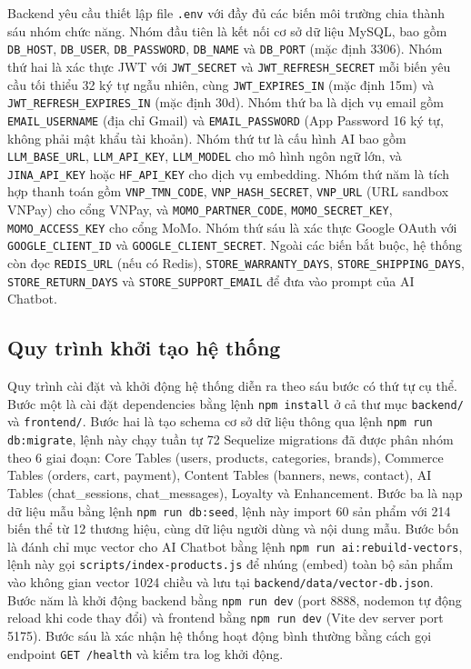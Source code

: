 Backend yêu cầu thiết lập file \texttt{.env} với đầy đủ các biến môi trường chia thành sáu nhóm chức năng. Nhóm đầu tiên là kết nối cơ sở dữ liệu MySQL, bao gồm \texttt{DB\_HOST}, \texttt{DB\_USER}, \texttt{DB\_PASSWORD}, \texttt{DB\_NAME} và \texttt{DB\_PORT} (mặc định 3306). Nhóm thứ hai là xác thực JWT với \texttt{JWT\_SECRET} và \texttt{JWT\_REFRESH\_SECRET} mỗi biến yêu cầu tối thiểu 32 ký tự ngẫu nhiên, cùng \texttt{JWT\_EXPIRES\_IN} (mặc định 15m) và \texttt{JWT\_REFRESH\_EXPIRES\_IN} (mặc định 30d). Nhóm thứ ba là dịch vụ email gồm \texttt{EMAIL\_USERNAME} (địa chỉ Gmail) và \texttt{EMAIL\_PASSWORD} (App Password 16 ký tự, không phải mật khẩu tài khoản). Nhóm thứ tư là cấu hình AI bao gồm \texttt{LLM\_BASE\_URL}, \texttt{LLM\_API\_KEY}, \texttt{LLM\_MODEL} cho mô hình ngôn ngữ lớn, và \texttt{JINA\_API\_KEY} hoặc \texttt{HF\_API\_KEY} cho dịch vụ embedding. Nhóm thứ năm là tích hợp thanh toán gồm \texttt{VNP\_TMN\_CODE}, \texttt{VNP\_HASH\_SECRET}, \texttt{VNP\_URL} (URL sandbox VNPay) cho cổng VNPay, và \texttt{MOMO\_PARTNER\_CODE}, \texttt{MOMO\_SECRET\_KEY}, \texttt{MOMO\_ACCESS\_KEY} cho cổng MoMo. Nhóm thứ sáu là xác thực Google OAuth với \texttt{GOOGLE\_CLIENT\_ID} và \texttt{GOOGLE\_CLIENT\_SECRET}. Ngoài các biến bắt buộc, hệ thống còn đọc \texttt{REDIS\_URL} (nếu có Redis), \texttt{STORE\_WARRANTY\_DAYS}, \texttt{STORE\_SHIPPING\_DAYS}, \texttt{STORE\_RETURN\_DAYS} và \texttt{STORE\_SUPPORT\_EMAIL} để đưa vào prompt của AI Chatbot.

\subsection{Quy trình khởi tạo hệ thống}

Quy trình cài đặt và khởi động hệ thống diễn ra theo sáu bước có thứ tự cụ thể. Bước một là cài đặt dependencies bằng lệnh \texttt{npm install} ở cả thư mục \texttt{backend/} và \texttt{frontend/}. Bước hai là tạo schema cơ sở dữ liệu thông qua lệnh \texttt{npm run db:migrate}, lệnh này chạy tuần tự 72 Sequelize migrations đã được phân nhóm theo 6 giai đoạn: Core Tables (users, products, categories, brands), Commerce Tables (orders, cart, payment), Content Tables (banners, news, contact), AI Tables (chat\_sessions, chat\_messages), Loyalty và Enhancement. Bước ba là nạp dữ liệu mẫu bằng lệnh \texttt{npm run db:seed}, lệnh này import 60 sản phẩm với 214 biến thể từ 12 thương hiệu, cùng dữ liệu người dùng và nội dung mẫu. Bước bốn là đánh chỉ mục vector cho AI Chatbot bằng lệnh \texttt{npm run ai:rebuild-vectors}, lệnh này gọi \texttt{scripts/index-products.js} để nhúng (embed) toàn bộ sản phẩm vào không gian vector 1024 chiều và lưu tại \texttt{backend/data/vector-db.json}. Bước năm là khởi động backend bằng \texttt{npm run dev} (port 8888, nodemon tự động reload khi code thay đổi) và frontend bằng \texttt{npm run dev} (Vite dev server port 5175). Bước sáu là xác nhận hệ thống hoạt động bình thường bằng cách gọi endpoint \texttt{GET /health} và kiểm tra log khởi động.

